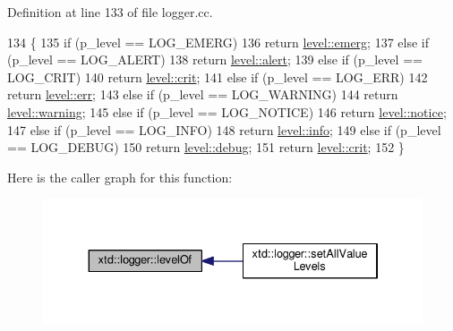 Definition at line 133 of file logger.\-cc.


\begin{DoxyCode}
134 \{
135   \textcolor{keywordflow}{if} (p\_level == LOG\_EMERG)
136     \textcolor{keywordflow}{return} \hyperlink{classxtd_1_1logger_a250ce2f143da181d7149a1556da2a6f1ae6cb8d153a4c27be572a177366bd7abc}{level::emerg};
137   \textcolor{keywordflow}{else} \textcolor{keywordflow}{if} (p\_level == LOG\_ALERT)
138     \textcolor{keywordflow}{return} \hyperlink{classxtd_1_1logger_a250ce2f143da181d7149a1556da2a6f1a7ed21143076d0cca420653d4345baa2f}{level::alert};
139   \textcolor{keywordflow}{else} \textcolor{keywordflow}{if} (p\_level == LOG\_CRIT)
140     \textcolor{keywordflow}{return} \hyperlink{classxtd_1_1logger_a250ce2f143da181d7149a1556da2a6f1a5888c6a8bb862595985926d16c7dcf13}{level::crit};
141   \textcolor{keywordflow}{else} \textcolor{keywordflow}{if} (p\_level == LOG\_ERR)
142     \textcolor{keywordflow}{return} \hyperlink{classxtd_1_1logger_a250ce2f143da181d7149a1556da2a6f1a56bd7107802ebe56c6918992f0608ec6}{level::err};
143   \textcolor{keywordflow}{else} \textcolor{keywordflow}{if} (p\_level == LOG\_WARNING)
144     \textcolor{keywordflow}{return} \hyperlink{classxtd_1_1logger_a250ce2f143da181d7149a1556da2a6f1a7b83d3f08fa392b79e3f553b585971cd}{level::warning};
145   \textcolor{keywordflow}{else} \textcolor{keywordflow}{if} (p\_level == LOG\_NOTICE)
146     \textcolor{keywordflow}{return} \hyperlink{classxtd_1_1logger_a250ce2f143da181d7149a1556da2a6f1aefd2af60c8501931cb9c736b5ad74f65}{level::notice};
147   \textcolor{keywordflow}{else} \textcolor{keywordflow}{if} (p\_level == LOG\_INFO)
148     \textcolor{keywordflow}{return} \hyperlink{classxtd_1_1logger_a250ce2f143da181d7149a1556da2a6f1acaf9b6b99962bf5c2264824231d7a40c}{level::info};
149   \textcolor{keywordflow}{else} \textcolor{keywordflow}{if} (p\_level == LOG\_DEBUG)
150     \textcolor{keywordflow}{return} \hyperlink{classxtd_1_1logger_a250ce2f143da181d7149a1556da2a6f1aad42f6697b035b7580e4fef93be20b4d}{level::debug};
151   \textcolor{keywordflow}{return} \hyperlink{classxtd_1_1logger_a250ce2f143da181d7149a1556da2a6f1a5888c6a8bb862595985926d16c7dcf13}{level::crit};
152 \}
\end{DoxyCode}


Here is the caller graph for this function\-:
\nopagebreak
\begin{figure}[H]
\begin{center}
\leavevmode
\includegraphics[width=334pt]{classxtd_1_1logger_afa70268de8cc055f4903a54fa61c52df_icgraph}
\end{center}
\end{figure}


